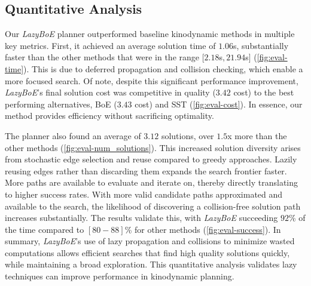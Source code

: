 \subsection{Quantitative Analysis}

Our \textsl{LazyBoE} planner outperformed baseline kinodynamic methods in multiple key metrics. %
First, it achieved an average solution time of $1.06$s, substantially faster than the other methods that were in the range $[2.18$s$, 21.94$s$]$ (\cref{fig:eval-time}). 
This is due to deferred propagation and collision checking, which enable a more focused search.
Of note, despite this significant performance improvement, \textsl{LazyBoE}'s final solution cost was competitive in quality ($3.42$ cost) to the best performing alternatives, BoE ($3.43$ cost) and SST (\cref{fig:eval-cost}). In essence, our method provides efficiency without sacrificing optimality.

The planner also found an average of $3.12$ solutions, over $1.5$x more than the other methods (\cref{fig:eval-num_solutions}). 
This increased solution diversity arises from stochastic edge selection and reuse compared to greedy approaches. Lazily reusing edges rather than discarding them expands the search frontier faster. More paths are available to evaluate and iterate on, thereby directly translating to higher success rates. With more valid candidate paths approximated and available to the search, the likelihood of discovering a collision-free solution path increases substantially. The results validate this, with \textsl{LazyBoE} succeeding $92$\% of the time compared to $[80-88]$\% for other methods (\cref{fig:eval-success}).
In summary, \textsl{LazyBoE}'s use of lazy propagation and collisions to minimize wasted computations allows efficient searches that find high quality solutions quickly, while maintaining a broad exploration. This quantitative analysis validates lazy techniques can improve performance in kinodynamic planning.
